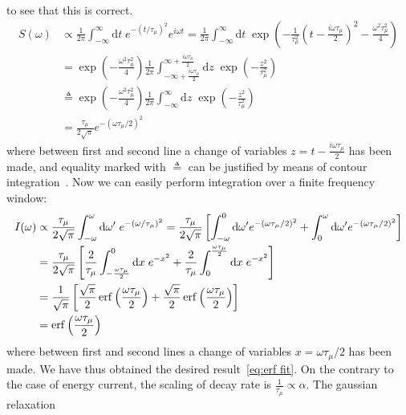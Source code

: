 to see that this is correct.
\begin{align}
  S(\omega) &\propto \frac{1}{2\pi} \int_{-\infty}^{\infty} \mathrm{d}t \; e^{-(t/\tau_{\mu})^2}
  e^{i\omega t} = \frac{1}{2\pi} \int_{-\infty}^{\infty} \mathrm{d}t \; 
  \exp\left(-\frac{1}{\tau_{\mu}^2} \left(t-\frac{i\omega\tau_{\mu}}{2}\right)^2 
  - \frac{\omega^2\tau_{\mu}^2}{4}\right) \nonumber \\
  &= \exp\left(- \frac{\omega^2\tau_{\mu}^2}{4}\right) \frac{1}{2\pi}
  \int_{-\infty+\frac{i\omega\tau_{\mu}}{2}}^{\infty+\frac{i\omega\tau_{\mu}}{2}} 
  \mathrm{d} z\; \exp\left(-\frac{z^2}{\tau_{\mu}^2}\right) \nonumber\\
  & \triangleq \exp\left(- \frac{\omega^2
  \tau_{\mu}^2}{4}\right) \frac{1}{2\pi} \int_{-\infty}^{\infty}
  \mathrm{d} z\; \exp\left(-\frac{z^2}{\tau_{\mu}^2}\right) \nonumber  \\
  &= \frac{\tau_{\mu}}{2\sqrt{\pi}}e^{-(\omega \tau_{\mu}/2)^2}
\end{align}
where between first and second line a change of variables \(z = t-\frac{i \omega \tau_{\mu}}{2}\)
has been made, and equality marked with \(\triangleq\) can be justified by means of contour
integration~\autocite{Stein2010}. Now we can easily perform integration over a finite
frequency window:
\begin{align}
  I(\omega) &\propto \frac{\tau_{\mu}}{2\sqrt{\pi}}\int_{-\omega}^{\omega} \mathrm{d}\omega^{\prime}\;
  e^{-(\omega/\tau_{\mu})^2} = \frac{\tau_{\mu}}{2\sqrt{\pi}}
  \left[\int_{-\omega}^{0} \mathrm{d}\omega^{\prime} e^{-(\omega\tau_{\mu}/2)^2} + 
  \int_{0}^{\omega} \mathrm{d}\omega^{\prime} e^{-(\omega\tau_{\mu}/2)^2} \right]\nonumber\\
  &= \frac{\tau_{\mu}}{2\sqrt{\pi}} \left[ \frac{2}{\tau_{\mu}}\int_{-\frac{\omega\tau_{\mu}}{2}}^{0} 
  \mathrm{d} x\;  e^{-x^2} + \frac{2}{\tau_{\mu}}\int_{0}^{\frac{\omega\tau_{\mu}}{2}}
   \mathrm{d}x\; e^{-x^2} \right]\nonumber\\ 
   &= \frac{1}{\sqrt{\pi}} \left[ \frac{\sqrt{\pi}}{2} \erf\left(\frac{\omega\tau_{\mu}}{2}\right) +
   \frac{\sqrt{\pi}}{2} \erf\left(\frac{\omega\tau_{\mu}}{2}\right) \right]\nonumber\\
    &= \erf\left(\frac{\omega\tau_{\mu}}{2}\right)
\end{align}
where between first and second lines a change of variables \(x=\omega\tau_{\mu}/2\) has been made.
We have thus obtained the desired result~\ref{eq:erf fit}. On the contrary to the case of energy
current, the scaling of decay rate is \(\frac{1}{\tau_{\mu}} \propto \alpha\). The gaussian relaxation
